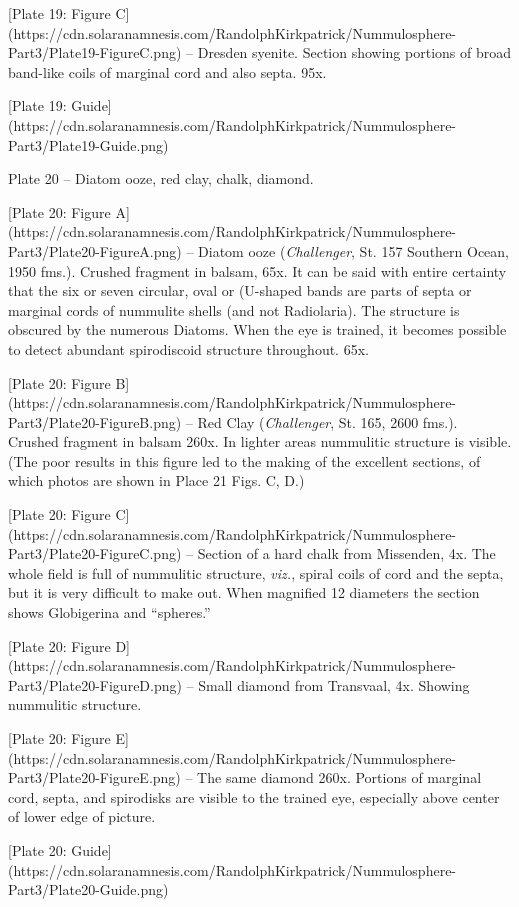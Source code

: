 \documentclass[a4paper, 12pt, oneside]{article}
\begin{document}
[Plate 19: Figure C](https://cdn.solaranamnesis.com/RandolphKirkpatrick/Nummulosphere-Part3/Plate19-FigureC.png) -- Dresden syenite. Section showing portions of broad band-like coils of marginal cord and also septa. 95x.

[Plate 19: Guide](https://cdn.solaranamnesis.com/RandolphKirkpatrick/Nummulosphere-Part3/Plate19-Guide.png)

Plate 20 -- Diatom ooze, red clay, chalk, diamond.

[Plate 20: Figure A](https://cdn.solaranamnesis.com/RandolphKirkpatrick/Nummulosphere-Part3/Plate20-FigureA.png) -- Diatom ooze (\emph{Challenger}, St. 157 Southern Ocean, 1950 fms.). Crushed fragment in balsam, 65x. It can be said with entire certainty that the six or seven circular, oval or (U-shaped bands are parts of septa or marginal cords of nummulite shells (and not Radiolaria). The structure is obscured by the numerous Diatoms. When the eye is trained, it becomes possible to detect abundant spirodiscoid structure throughout. 65x.

[Plate 20: Figure B](https://cdn.solaranamnesis.com/RandolphKirkpatrick/Nummulosphere-Part3/Plate20-FigureB.png) -- Red Clay (\emph{Challenger}, St. 165, 2600 fms.). Crushed fragment in balsam 260x. In lighter areas nummulitic structure is visible. (The poor results in this figure led to the making of the excellent sections, of which photos are shown in Place 21 Figs. C, D.)

[Plate 20: Figure C](https://cdn.solaranamnesis.com/RandolphKirkpatrick/Nummulosphere-Part3/Plate20-FigureC.png) -- Section of a hard chalk from Missenden, 4x. The whole field is full of nummulitic structure, \emph{viz.}, spiral coils of cord and the septa, but it is very difficult to make out. When magnified 12 diameters the section shows Globigerina and ``spheres.''

[Plate 20: Figure D](https://cdn.solaranamnesis.com/RandolphKirkpatrick/Nummulosphere-Part3/Plate20-FigureD.png) -- Small diamond from Transvaal, 4x. Showing nummulitic structure.

[Plate 20: Figure E](https://cdn.solaranamnesis.com/RandolphKirkpatrick/Nummulosphere-Part3/Plate20-FigureE.png) -- The same diamond 260x. Portions of marginal cord, septa, and spirodisks are visible to the trained eye, especially above center of lower edge of picture.

[Plate 20: Guide](https://cdn.solaranamnesis.com/RandolphKirkpatrick/Nummulosphere-Part3/Plate20-Guide.png)
\end{document}
